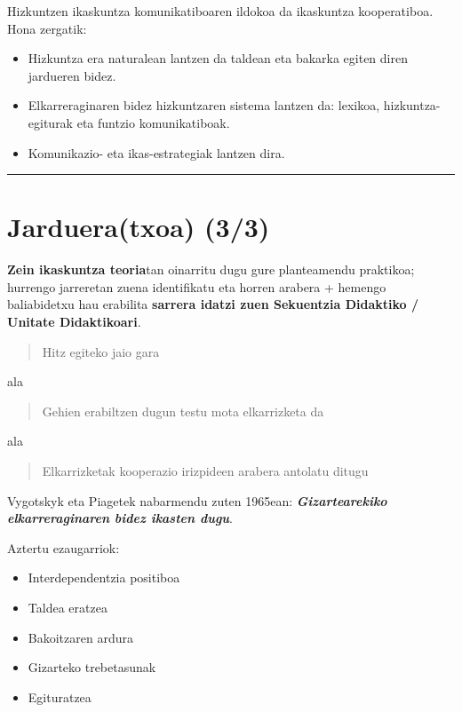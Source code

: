 \documentclass[]{book}
\providecommand{\tightlist}{%
  \setlength{\itemsep}{0pt}\setlength{\parskip}{0pt}}
\begin{document}
Hizkuntzen ikaskuntza komunikatiboaren ildokoa da ikaskuntza kooperatiboa. Hona zergatik:

\begin{itemize}
\tightlist
\item
  Hizkuntza era naturalean lantzen da taldean eta bakarka egiten diren jardueren bidez.
\item
  Elkarreraginaren bidez hizkuntzaren sistema lantzen da: lexikoa, hizkuntza-egiturak eta funtzio komunikatiboak.
\item
  Komunikazio- eta ikas-estrategiak lantzen dira.
\end{itemize}

\begin{center}\rule{0.5\linewidth}{\linethickness}\end{center}

\hypertarget{jardueratxoa-33}{%
\chapter*{Jarduera(txoa) (3/3)}\label{jardueratxoa-33}}

\textbf{Zein ikaskuntza teoria}tan oinarritu dugu gure planteamendu praktikoa; hurrengo jarreretan zuena identifikatu eta horren arabera + hemengo baliabidetxu hau erabilita \textbf{sarrera idatzi zuen Sekuentzia Didaktiko / Unitate Didaktikoari}.

\begin{quote}
Hitz egiteko jaio gara
\end{quote}

ala

\begin{quote}
Gehien erabiltzen dugun testu mota elkarrizketa da
\end{quote}

ala

\begin{quote}
Elkarrizketak kooperazio irizpideen arabera antolatu ditugu
\end{quote}

Vygotskyk eta Piagetek nabarmendu zuten 1965ean: \textbf{\emph{Gizartearekiko elkarreraginaren bidez ikasten dugu}}.

Aztertu ezaugarriok:

\begin{itemize}
\tightlist
\item
  Interdependentzia positiboa
\item
  Taldea eratzea
\item
  Bakoitzaren ardura
\item
  Gizarteko trebetasunak
\item
  Egituratzea
\end{itemize}
\end{document}
